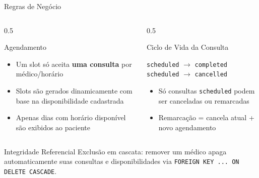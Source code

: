 \documentclass[xcolor={table}]{beamer}
\begin{document}
\begin{frame}{Regras de Negócio}
    \begin{columns}
        \begin{column}{0.5\textwidth}
            \begin{block}{Agendamento}
                \begin{itemize}
                    \item[\color{ClinicBlue}$\checkmark$] Um slot só aceita \textbf{uma consulta} por médico/horário
                    \item[\color{ClinicBlue}$\checkmark$] Slots são gerados dinamicamente com base na disponibilidade cadastrada
                    \item[\color{ClinicBlue}$\checkmark$] Apenas dias com horário disponível são exibidos ao paciente
                \end{itemize}
            \end{block}
        \end{column}
        \begin{column}{0.5\textwidth}
            \begin{block}{Ciclo de Vida da Consulta}
                \begin{center}
                \small
                \texttt{scheduled} $\rightarrow$ \texttt{completed}\\
                \texttt{scheduled} $\rightarrow$ \texttt{cancelled}
                \end{center}
                \begin{itemize}
                    \item[\color{ClinicBlue}$\checkmark$] Só consultas \texttt{scheduled} podem ser canceladas ou remarcadas
                    \item[\color{ClinicBlue}$\checkmark$] Remarcação = cancela atual + novo agendamento
                \end{itemize}
            \end{block}
        \end{column}
    \end{columns}
    \vspace{0.2cm}
    \begin{alertblock}{Integridade Referencial}
        \small
        Exclusão em cascata: remover um médico apaga automaticamente suas consultas e disponibilidades via \texttt{FOREIGN KEY ... ON DELETE CASCADE}.
    \end{alertblock}
\end{frame}
\end{document}
